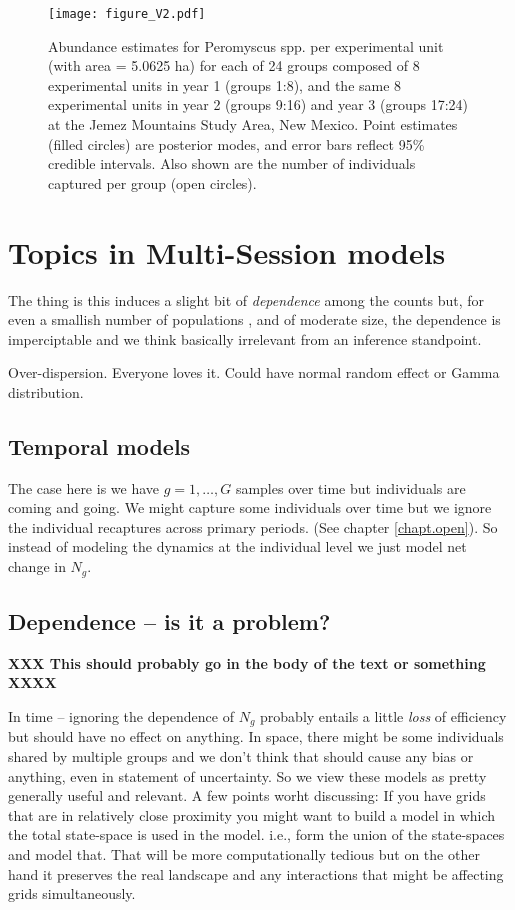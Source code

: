 \clearpage





\begin{figure}[htp]
\begin{center}
\texttt{[image: figure\_V2.pdf]}
\end{center}
\caption{
Abundance estimates for Peromyscus spp. per experimental unit
(with area = 5.0625 ha) for each of 24 groups composed of 8
experimental units in year 1 (groups 1:8), and the same 8
experimental units in year 2 (groups 9:16) and year 3 (groups 17:24)
at the Jemez Mountains Study Area, New Mexico.  Point estimates
(filled circles) are posterior modes, and error bars reflect 95\%
credible intervals. Also shown are the number of individuals
captured per group (open circles).  }
\label{fig.fig1}
\end{figure}


\section{Topics in Multi-Session models}

The thing is this induces a slight bit of {\it dependence} among the
counts but, for even a smallish number of populations , and of
moderate size, the dependence is imperciptable and we think basically
irrelevant from an inference standpoint. 

Over-dispersion. Everyone loves it. Could have normal random effect or
Gamma distribution. 

\subsection{Temporal models }

The case here is we have $g=1,\ldots,G$ samples over time but
individuals are coming and going.
We might capture some individuals over time but we ignore the
individual recaptures across primary periods. (See chapter
\ref{chapt.open}). So instead of modeling the dynamics at the individual
level we just model net change in $N_{g}$.


\subsection{Dependence -- is it a problem?}

{\bf XXX This should probably go in the body of the text or something XXXX}

In time -- ignoring the dependence of $N_{g}$ probably entails a
little {\it loss} of efficiency but should have no effect on anything.
In space, there might be some individuals shared by multiple groups
and we don't think that should cause any bias or anything, even in
statement of uncertainty. So we view these models as pretty generally
useful and relevant.
A few points worht discussing: If you have grids that are in
relatively close proximity you might want to build a model in which
the total state-space is used in the model. i.e., form the union of
the state-spaces and model that. That will be more computationally
tedious but on the other hand it preserves the real landscape and any
interactions that might be affecting grids simultaneously. 


